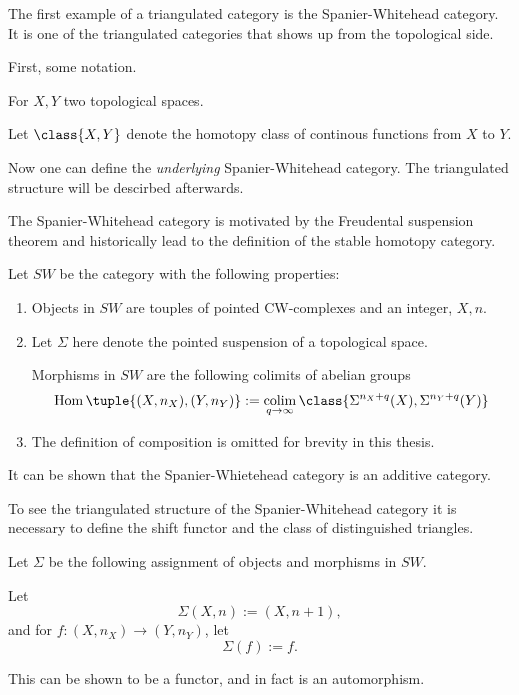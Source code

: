 The first example of a triangulated category is the Spanier-Whitehead category. It is one of the triangulated categories that shows up from the topological side.

First, some notation.
\begin{notation}
    For \( X, Y \) two topological spaces.

    Let \( \class{ X, Y } \) denote the homotopy class of continous functions from \( X \) to \( Y \).
\end{notation}

Now one can define the \emph{underlying} Spanier-Whitehead category. The triangulated structure will be descirbed afterwards.

The Spanier-Whitehead category is motivated by the Freudental suspension theorem and historically lead to the definition of the stable homotopy category.

\begin{definition}
    \label{def:sw-cat}
    Let \( SW \) be the category with the following properties:
    \begin{enumerate}
        \item {
            Objects in \( SW \) are touples of pointed CW-complexes and an integer, \( X, n \).
        }
        \item {
            Let \( \Sigma \) here denote the pointed suspension of a topological space.

            Morphisms in \( SW \) are the following colimits of abelian groups
            \[
                \Hom\tuple{ (X, n_X), (Y, n_Y) } := \colim_{q \to \infty} \class{ \Sigma^{n_X + q}(X), \Sigma^{n_Y + q}(Y) }
            \]
        }
        \item {
            The definition of composition is omitted for brevity in this thesis.
        }
    \end{enumerate}
\end{definition}

It can be shown that the Spanier-Whietehead category is an additive category.

To see the triangulated structure of the Spanier-Whitehead category it is necessary to define the shift functor and the class of distinguished triangles.

\begin{definition}
    \label{def:sw-shift}
    Let \( \Sigma \) be the following assignment of objects and morphisms in \( SW \).

    Let
    \[
        \Sigma(X, n) := (X, n + 1),
    \] 
    and for \( f: (X, n_X) \to (Y, n_Y) \), let
    \[
        \Sigma(f) := f.
    \]

    This can be shown to be a functor, and in fact is an automorphism.
\end{definition}


